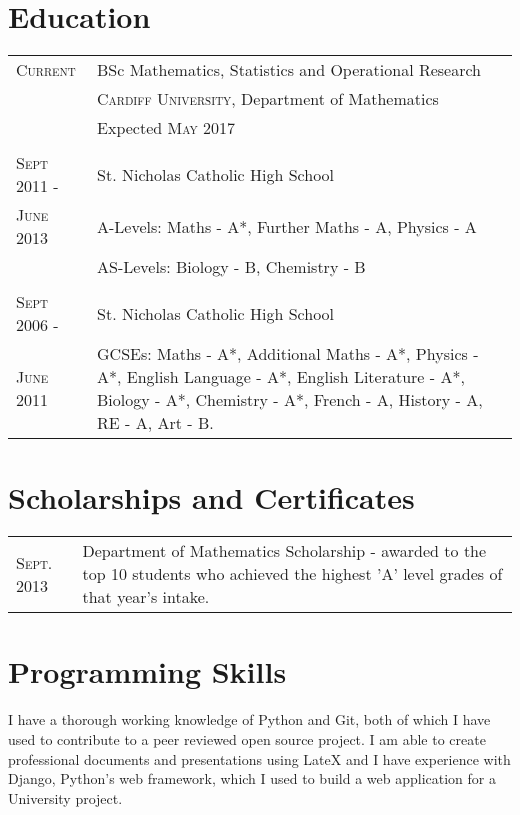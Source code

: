 \documentclass[a4paper, 11pt]{article}
\begin{document}
\section{Education}
\begin{tabularx}{\textwidth}{lX}

\textsc{Current} & \textsc BSc Mathematics, Statistics and Operational Research \\
&\normalsize \textsc{Cardiff University}, Department of Mathematics\\
& Expected \textsc{May} 2017\\
\\
\textsc{Sept 2011 -} & St. Nicholas Catholic High School\\
\textsc{June 2013} & A-Levels: Maths - A*, Further Maths - A, Physics - A\\
& AS-Levels: Biology - B, Chemistry - B\\
\\
\textsc{Sept 2006 -} & St. Nicholas Catholic High School\\
\textsc{June 2011} & GCSEs: Maths - A*, Additional Maths - A*, Physics - A*, English Language - A*, English Literature - A*, Biology - A*, Chemistry - A*, French - A, History - A, RE - A, Art - B.\\

\end{tabularx}
\section{Scholarships and Certificates}
\begin{tabularx}{\textwidth}{lX}

\textsc{Sept.} 2013 & Department of Mathematics Scholarship - awarded to the top 10 students who achieved the highest 'A' level grades of that year's intake.\\

\end{tabularx}
\section{Programming Skills}
I have a thorough working knowledge of Python and Git, both of which I have used to contribute to a peer reviewed open source project. I am able to create professional documents and presentations using LateX and I have experience with Django, Python's web framework, which I used to build a web application for a University project.
\end{document}
